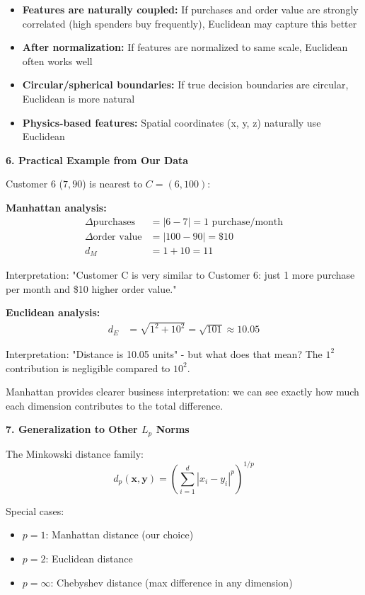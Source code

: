 \documentclass[12pt]{article}
\begin{document}
\begin{explanation}
\begin{itemize}
    \item \textbf{Features are naturally coupled:} If purchases and order value are strongly correlated (high spenders buy frequently), Euclidean may capture this better
    \item \textbf{After normalization:} If features are normalized to same scale, Euclidean often works well
    \item \textbf{Circular/spherical boundaries:} If true decision boundaries are circular, Euclidean is more natural
    \item \textbf{Physics-based features:} Spatial coordinates (x, y, z) naturally use Euclidean
\end{itemize}

\textbf{6. Practical Example from Our Data}

Customer 6 (\(7, 90\)) is nearest to \(C = (6, 100)\):

\textbf{Manhattan analysis:}
\begin{align*}
\Delta \text{purchases} &= |6-7| = 1 \text{ purchase/month} \\
\Delta \text{order value} &= |100-90| = \$10 \\
d_M &= 1 + 10 = 11
\end{align*}

Interpretation: "Customer C is very similar to Customer 6: just 1 more purchase per month and \$10 higher order value."

\textbf{Euclidean analysis:}
\begin{align*}
d_E &= \sqrt{1^2 + 10^2} = \sqrt{101} \approx 10.05
\end{align*}

Interpretation: "Distance is 10.05 units" - but what does that mean? The \(1^2\) contribution is negligible compared to \(10^2\).

Manhattan provides clearer business interpretation: we can see exactly how much each dimension contributes to the total difference.

\textbf{7. Generalization to Other \(L_p\) Norms}

The Minkowski distance family:
\[
d_p(\mathbf{x}, \mathbf{y}) = \left(\sum_{i=1}^d |x_i - y_i|^p\right)^{1/p}
\]

Special cases:
\begin{itemize}
    \item \(p=1\): Manhattan distance (our choice)
    \item \(p=2\): Euclidean distance
    \item \(p=\infty\): Chebyshev distance (max difference in any dimension)
\end{itemize}


\end{explanation}
\end{document}
